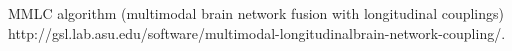 MMLC algorithm (multimodal brain network 
fusion with longitudinal couplings)
http://gsl.lab.asu.edu/software/multimodal-longitudinalbrain-network-coupling/. 
\cite{Zhang2022}